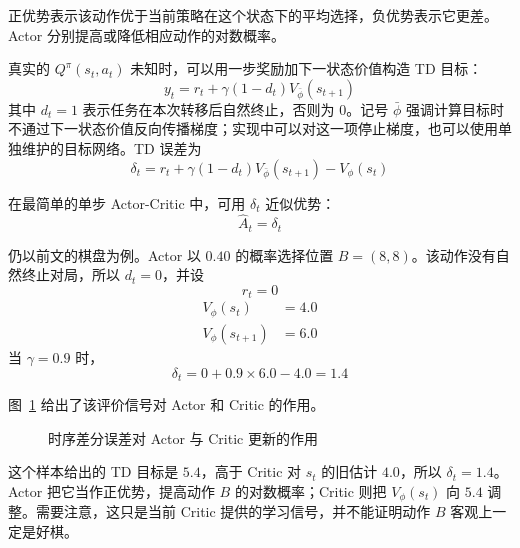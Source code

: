 正优势表示该动作优于当前策略在这个状态下的平均选择，负优势表示它更差。Actor 分别提高或降低相应动作的对数概率。

真实的 $Q^\pi(s_t,a_t)$ 未知时，可以用一步奖励加下一状态价值构造 TD 目标：
\begin{equation}
y_t=r_t+\gamma(1-d_t)V_{\bar\phi}(s_{t+1})
\end{equation}
其中 $d_t=1$ 表示任务在本次转移后自然终止，否则为 0。记号 $\bar\phi$ 强调计算目标时不通过下一状态价值反向传播梯度；实现中可以对这一项停止梯度，也可以使用单独维护的目标网络。TD 误差为
\begin{equation}
\delta_t
=
r_t+\gamma(1-d_t)V_{\bar\phi}(s_{t+1})-V_{\phi}(s_t)
\end{equation}

在最简单的单步 Actor-Critic 中，可用 $\delta_t$ 近似优势：
\begin{equation}
\widehat{A}_t
=
\delta_t
\end{equation}

仍以前文的棋盘为例。Actor 以 $0.40$ 的概率选择位置 $B=(8,8)$。该动作没有自然终止对局，所以 $d_t=0$，并设
\begin{equation}
r_t=0
\end{equation}
\begin{align}
V_{\phi}(s_t)&=4.0\\
V_{\phi}(s_{t+1})&=6.0
\end{align}
当 $\gamma=0.9$ 时，
\begin{equation}
\delta_t
=
0+0.9\times6.0-4.0
=
1.4
\end{equation}

图~\ref{fig:actor_critic_td_update} 给出了该评价信号对 Actor 和 Critic 的作用。

\begin{figure}[htbp]
  \centering
  \caption{时序差分误差对 Actor 与 Critic 更新的作用}
  \label{fig:actor_critic_td_update}
\end{figure}

这个样本给出的 TD 目标是 $5.4$，高于 Critic 对 $s_t$ 的旧估计 $4.0$，所以 $\delta_t=1.4$。Actor 把它当作正优势，提高动作 $B$ 的对数概率；Critic 则把 $V_\phi(s_t)$ 向 $5.4$ 调整。需要注意，这只是当前 Critic 提供的学习信号，并不能证明动作 $B$ 客观上一定是好棋。

